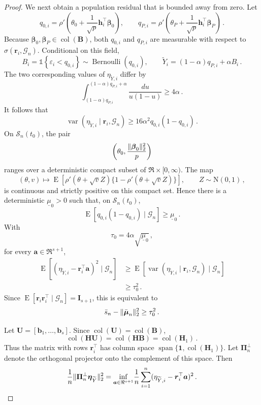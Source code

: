\documentclass{article}
\makeatletter
\DeclareMathOperator{\expect}{E}
\DeclareMathOperator{\var}{var}
\theoremstyle{definition}
\newcommand{\vnorm}[1]{%
	\ensuremath{%
		\if@display
		\left\| #1 \right\|
		\else
		\| #1 \|
		\fi
	}%
}
\newcommand*{\bb}{\boldsymbol}
\def\bH {\bb{H}}
\def\bmu{\bb{\mu}}
\def\bh{\bb{h}}
\def\Ytil{\widetilde{Y}}
\def\bEtaYtil{\bb{\eta}_{\Ytil}}
\def\bbeta{\bb{\beta}}
\def\bH{\bb{H}}
\newcommand{\vspan}{\operatorname{span}}
\makeatother
\begin{document}
\begin{bibunit}
\begin{proof}
We next obtain a population residual that is bounded away from zero. Let
$$
	q_{0,i}
	=
	\rho'\left(
		\theta_0
		+
		\frac1{\sqrt p}\bh_i^\top\bbeta_0
	\right),
	\qquad
	q_{P,i}
	=
	\rho'\left(
		\theta_P
		+
		\frac1{\sqrt p}\bh_i^\top\bbeta_P
	\right)\,.
$$
Because $\bbeta_0,\bbeta_P\in\operatorname{col}(\bb B)$, both
$q_{0,i}$ and $q_{P,i}$ are measurable with respect to
$\sigma(\bb r_i,\mathcal G_n)$. Conditional on this field,
$$
	B_i
	=
	\mathds{1}
	\left\{
		\varepsilon_i<q_{0,i}
	\right\}
	\sim
	\operatorname{Bernoulli}(q_{0,i}),
	\qquad
	\Ytil_i
	=
	(1-\alpha)q_{P,i}+\alpha B_i\,.
$$
The two corresponding values of $\eta_{\Ytil,i}$ differ by
$$
	\int_{(1-\alpha)q_{P,i}}^{(1-\alpha)q_{P,i}+\alpha}
	\frac{du}{u(1-u)}
	\geq
	4\alpha\,.
$$
It follows that
$$
	\var(
		\eta_{\Ytil,i}
		\mid
		\bb r_i,\mathcal G_n
	)
	\geq
	16\alpha^2q_{0,i}(1-q_{0,i})\,.
$$
On $\mathcal S_n(t_0)$, the pair
$$
	\left(
		\theta_0,
		\frac{\vnorm{\bbeta_0}_2^2}{p}
	\right)
$$
ranges over a deterministic compact subset of $\Re\times[0,\infty)$.
The map
$$
	(\theta,v)
	\longmapsto
	\expect\left[
		\rho'(\theta+\sqrt v Z)
		\{1-\rho'(\theta+\sqrt v Z)\}
	\right],
	\qquad
	Z\sim\mathrm N(0,1)\,,
$$
is continuous and strictly positive on this compact set. Hence there is a
deterministic $\underline\mu_0>0$ such that, on
$\mathcal S_n(t_0)$,
$$
	\expect[
		q_{0,i}(1-q_{0,i})
		\mid
		\mathcal G_n
	]
	\geq
	\underline\mu_0\,.
$$
With
$$
	\tau_0
	=
	4\alpha\sqrt{\underline\mu_0}\,,
$$
for every $\bb a\in\Re^{s+1}$,
$$
\begin{aligned}
	\expect\left[
		(\eta_{\Ytil,i}-\bb r_i^\top\bb a)^2
		\mid
		\mathcal G_n
	\right]
	&\geq
	\expect\left[
		\var(
			\eta_{\Ytil,i}
			\mid
			\bb r_i,\mathcal G_n
		)
		\mid
		\mathcal G_n
	\right]
	\\
	&\geq
	\tau_0^2\,.
\end{aligned}
$$
Since $\expect[\bb r_i\bb r_i^\top\mid\mathcal G_n]=\bb I_{s+1}$,
this is equivalent to
\begin{equation}
\label{eq:small_r_population_residual}
	\bar s_n
	-
	\vnorm{\bar{\bmu}_n}_2^2
	\geq
	\tau_0^2 \,.
\end{equation}

Let $\bb U=[\bb b_1,\ldots,\bb b_s]$. Since
$\operatorname{col}(\bb U)=\operatorname{col}(\bb B)$,
$$
	\operatorname{col}(\bH\bb U)
	=
	\operatorname{col}(\bH\bb B)
	=
	\operatorname{col}(\bH_1) \,.
$$
Thus the matrix with rows $\bb r_i^\top$ has column space
$\vspan\{\bb1,\operatorname{col}(\bH_1)\}$. Let
$\bb\Pi_n^\perp$ denote the orthogonal projector onto the complement of
this space. Then
\begin{equation}
\label{eq:small_r_projection_residual_identity}
	\frac1n\vnorm{\bb\Pi_n^\perp\bEtaYtil}_2^2
	=
	\underset{\bb a\in\Re^{s+1}}{\inf}
	\frac1n\sum_{i=1}^n
	(\eta_{\Ytil,i}-\bb r_i^\top\bb a)^2 \,.
\end{equation}


\end{proof}
\end{bibunit}
\end{document}
